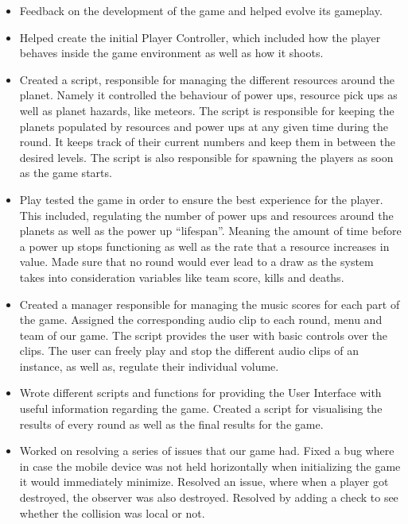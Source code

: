 \documentclass[11pt,a4paper]{article}
\begin{document}
        \begin{itemize}
          \item Feedback on the development of the game and helped evolve its gameplay.
           
          \item Helped create the initial Player Controller, which included how the player behaves inside the game environment as well as how it shoots.  

          \item Created a script, responsible for managing the different resources around the planet. Namely it controlled the behaviour of power ups, resource pick ups as well as planet hazards, like meteors. The script is responsible for keeping the planets populated by resources and power ups at any given time during the round. It keeps track of their current numbers and keep them in between the desired levels. The script is also responsible for spawning the players as soon as the game starts.

          \item Play tested the game in order to ensure the best experience for the player. This included, regulating the number of power ups and resources around the planets as well as the power up “lifespan”. Meaning the amount of time before a power up stops functioning as well as the rate that a resource increases in value. Made sure that no round would ever lead to a draw as the system takes into consideration variables like team score, kills and deaths.

          \item Created a manager responsible for managing the music scores for each part of the game. Assigned the corresponding audio clip to each round, menu and team of our game. The script provides the user with basic controls over the clips. The user can freely play and stop the different audio clips of an instance, as well as, regulate their individual volume.

          \item Wrote different scripts and functions for providing the User Interface with useful information regarding the game. Created a script for visualising the results of every round as well as the final results for the game. 

          \item Worked on resolving a series of issues that our game had. Fixed a bug where in case the mobile device was not held horizontally when initializing the game it would immediately minimize. Resolved an issue, where when a player got destroyed, the observer was also destroyed. Resolved by adding a check to see whether the collision was local or not.
        \end{itemize}
\end{document}
